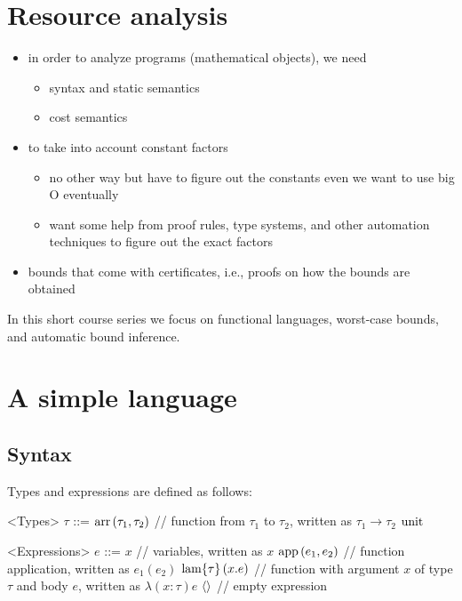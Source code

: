 \documentclass[ manuscript, review,screen, nonacm]{acmart}
\begin{document}
\section{Resource analysis}

\begin{itemize}
    \item in order to analyze programs (mathematical objects), we need
    \begin{itemize}
        \item syntax and static semantics
        \item cost semantics
    \end{itemize}
    \item to take into account constant factors
    \begin{itemize}
        \item no other way but have to figure out the constants even we want to use big O eventually
        \item want some help from proof rules, type systems, and other automation techniques to figure out the exact factors
    \end{itemize}
    \item bounds that come with certificates, i.e., proofs on how the bounds are obtained
\end{itemize}


In this short course series we focus on functional languages, worst-case bounds, and automatic bound inference.



\section{A simple language}

\subsection{Syntax}

Types and expressions are defined as follows:

\begin{grammar}
<Types> $\tau$ ::= $\mathrm{arr}\left(\tau_1,\tau_2\right)$ // function from $\tau_1$ to $\tau_2$, written as $\tau_1 \rightarrow \tau_2$
\alt $\mathrm{unit}$

<Expressions> $e$ ::= $x$ // variables, written as $x$
\alt $\mathrm{app}\left(e_1,e_2\right)$  // function application, written as $e_1(e_2)$
\alt $\mathrm{lam}\{\tau\}\left(x.e\right)$ // function with argument $x$ of type $\tau$ and body $e$, written as $\lambda(x:\tau)e$
\alt $\langle\rangle$   // empty expression
\end{grammar}
\end{document}
